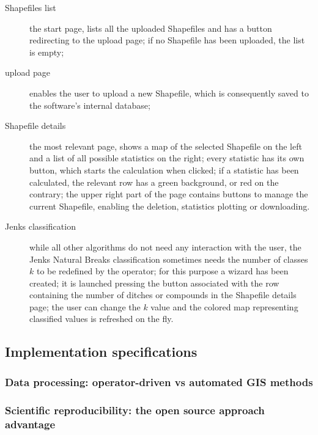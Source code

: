                 \begin{description}
                    \item[Shapefiles list] the start page, lists all the uploaded Shapefiles and has a button redirecting to the upload page; if no Shapefile has been uploaded, the list is empty;
                    \item[upload page] enables the user to upload a new Shapefile, which is consequently saved to the software's internal database;
                    \item[Shapefile details] the most relevant page, shows a map of the selected Shapefile on the left and a list of all possible statistics on the right; every statistic has its own button, which starts the calculation when clicked; if a statistic has been calculated, the relevant row has a green background, or red on the contrary; the upper right part of the page contains buttons to manage the current Shapefile, enabling the deletion, statistics plotting or downloading.

                    \item[Jenks classification] while all other algorithms do not need any interaction with the user, the Jenks Natural Breaks classification sometimes needs the number of classes $k$ to be redefined by the operator; for this purpose a wizard has been created; it is launched pressing the button associated with the row containing the number of ditches or compounds in the Shapefile details page; the user can change the $k$ value and the colored map representing classified values is refreshed on the fly.
                \end{description}

        \subsection{Implementation specifications}
            \subsubsection{Data processing: operator-driven vs automated GIS methods}
            \subsubsection{Scientific reproducibility: the open source approach advantage}
